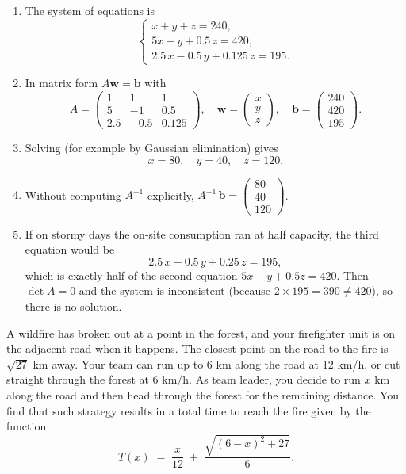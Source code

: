 \documentclass[11pt]{exam}
\begin{document}
\begin{questions}
\begin{solution}
\begin{enumerate}[label=(\alph*)]
  \item The system of equations is
  $$
    \begin{cases}
      x + y + z = 240,\\
      5x - y + 0.5\,z = 420,\\
      2.5\,x - 0.5\,y + 0.125\,z = 195.
    \end{cases}
  $$
  \item In matrix form \(A\mathbf w=\mathbf b\) with
  \[
    A=\begin{pmatrix}
      1   & 1      & 1     \\[3pt]
      5   & -1     & 0.5   \\[3pt]
      2.5 & -0.5   & 0.125
    \end{pmatrix},\quad
    \mathbf w=\begin{pmatrix}x\\y\\z\end{pmatrix},\quad
    \mathbf b=\begin{pmatrix}240\\420\\195\end{pmatrix}.
  \]
  \item Solving (for example by Gaussian elimination) gives
  \[
    x = 80,\quad
    y = 40,\quad
    z = 120.
  \]
  \item Without computing \(A^{-1}\) explicitly, $A^{-1}\,\mathbf b = \begin{pmatrix}80\\40\\120\end{pmatrix}$.
  \item If on stormy days the on‑site consumption ran at half capacity, the third equation would be
  \[
    2.5\,x - 0.5\,y + 0.25\,z = 195,
  \]
  which is exactly half of the second equation \(5x - y + 0.5z = 420\).  Then \(\det A=0\) and the system is inconsistent (because \(2\times195=390\neq420\)), so there is no solution.
\end{enumerate}
\end{solution}

\question[2.5]
A wildfire has broken out at a point in the forest, and your firefighter unit is on the adjacent road when it happens. The closest point on the road to the fire is $\sqrt{27}$ km away.  
Your team can run up to 6 km along the road at 12 km/h, or cut straight through the forest at 6 km/h. As team leader, you decide to run \(x\) km along the road and then head through the forest for the remaining distance. You find that such strategy results in a total time to reach the fire given by the function
\[
T(x) \;=\; \frac{x}{12} \;+\; \frac{\sqrt{(6 - x)^2 + 27}}{6}.
\]


\end{questions}
\end{document}
